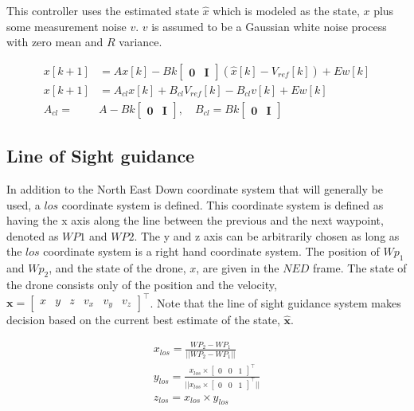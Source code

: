This controller uses the estimated state $\hat{x}$ which is modeled as the state, $x$ plus some measurement noise $v$. $v$ is assumed to be a Gaussian white noise process with zero mean and $R$ variance. 

\begin{align}
    x[k+1] & = A x[k] - B k \begin{bmatrix} \mathbf{0} & \mathbf{I} \end{bmatrix} (\hat{x}[k] - V_{ref}[k]) + E w[k] \\
    x[k+1] & = A_{cl} x[k] + B_{cl} V_{ref}[k] - B_{cl} v[k] + E w[k] \\
    A_{cl}  = &A - B k \begin{bmatrix} \mathbf{0} & \mathbf{I} \end{bmatrix}, \quad B_{cl} = B k \begin{bmatrix} \mathbf{0} & \mathbf{I} \end{bmatrix}
\end{align}

\subsection{Line of Sight guidance}

In addition to the North East Down coordinate system that will generally be used, a $los$ coordinate system is defined. This coordinate system is defined as having the x axis along the line between the previous and the next waypoint, denoted as $WP1$ and $WP2$. The y and z axis can be arbitrarily chosen as long as the $los$ coordinate system is a right hand coordinate system. The position of $Wp_1$ and $Wp_2$, and the state of the drone, $x$, are given in the $NED$ frame. The state of the drone consists only of the position and the velocity, $\textbf{x} = \begin{bmatrix} x & y & z & v_x & v_y & v_z\end{bmatrix}^\top$. Note that the line of sight guidance system makes decision based on the current best estimate of the state, $\mathbf{{\hat{x}}}$.

\begin{align}
    x_{los} = \frac{WP_2 - WP_1}{||WP_2 - WP_1||} \\
    y_{los} = \frac{x_{los} \times \begin{bmatrix} 0&0&1\end{bmatrix}^\top}{|| x_{los} \times \begin{bmatrix} 0&0&1\end{bmatrix}^\top ||}\label{y_los}\\ 
    z_{los} = x_{los} \times y_{los}
\end{align}

